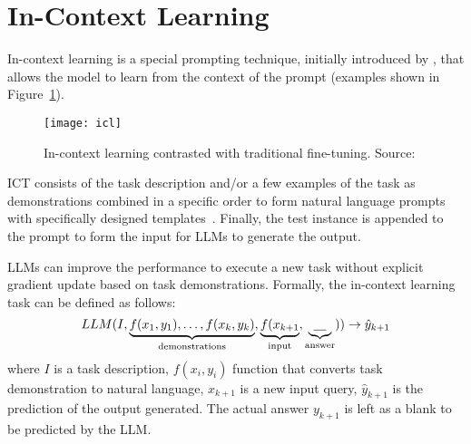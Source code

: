 \section{In-Context Learning}
\label{sec:in-context-learning}
In-context learning is a special prompting technique, initially introduced by \textcite{brown2020language}, that allows the model to learn from the context of the prompt (examples shown in Figure~\ref{fig:in-context-learning}).
\begin{figure}[h!]
	\centering
	\texttt{[image: icl]}
	\caption{In-context learning contrasted with traditional fine-tuning. Source: \textcite{brown2020language}}
	\label{fig:in-context-learning}
\end{figure}
ICT consists of the task description and/or a few examples of the task as demonstrations combined in a specific order to form natural language prompts with specifically designed templates~\cite{brown2020language}.
Finally, the test instance is appended to the prompt to form the input for LLMs to generate the output.

LLMs can improve the performance to execute a new task without explicit gradient update based on task demonstrations.
Formally, the in-context learning task can be defined as follows:
\begin{equation}
	LLM(I, \underbrace{f(x_1, y_1), \dots, f(x_k, y_k)}_\text{demonstrations}, \underbrace{f(x_{k+1}}_\text{input}, \underbrace{\uline{~~~}}_\text{answer})) \rightarrow \hat{y}_{k+1}
	\label{eq:ict}
\end{equation}
where $I$ is a task description, $f(x_i, y_i)$ function that converts task demonstration to natural language, $x_{k+1}$ is a new input query, $\hat{y}_{k+1}$ is the prediction of the output generated.
The actual answer $y_{k+1}$ is left as a blank to be predicted by the LLM\@.

